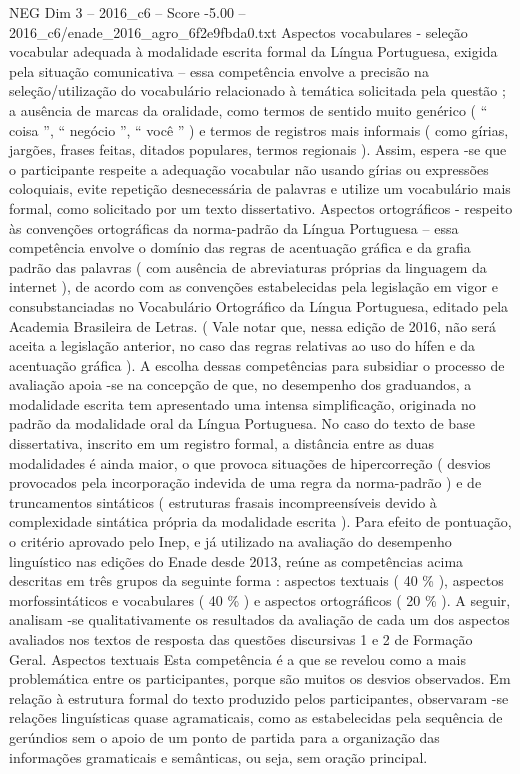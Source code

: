 \begin{textsample}{NEG Dim 3 – 2016\_c6 – Score -5.00 – 2016\_c6/enade\_2016\_agro\_6f2e9fbda0.txt}
Aspectos vocabulares - seleção vocabular adequada à modalidade escrita formal da Língua Portuguesa, exigida pela situação comunicativa – essa competência envolve a precisão na seleção/utilização do vocabulário relacionado à temática solicitada pela questão ; a ausência de marcas da oralidade, como termos de sentido muito genérico ( “ coisa ”, “ negócio ”, “ você ” ) e termos de registros mais informais ( como gírias, jargões, frases feitas, ditados populares, termos regionais ).
Assim, espera -se que o participante respeite a adequação vocabular não usando gírias ou expressões coloquiais, evite repetição desnecessária de palavras e utilize um vocabulário mais formal, como solicitado por um texto dissertativo.
Aspectos ortográficos - respeito às convenções ortográficas da norma-padrão da Língua Portuguesa – essa competência envolve o domínio das regras de acentuação gráfica e da grafia padrão das palavras ( com ausência de abreviaturas próprias da linguagem da internet ), de acordo com as convenções estabelecidas pela legislação em vigor e consubstanciadas no Vocabulário Ortográfico da Língua Portuguesa, editado pela Academia Brasileira de Letras. ( Vale notar que, nessa edição de 2016, não será aceita a legislação anterior, no caso das regras relativas ao uso do hífen e da acentuação gráfica ).
A escolha dessas competências para subsidiar o processo de avaliação apoia -se na concepção de que, no desempenho dos graduandos, a modalidade escrita tem apresentado uma intensa simplificação, originada no padrão da modalidade oral da Língua Portuguesa.
No caso do texto de base dissertativa, inscrito em um registro formal, a distância entre as duas modalidades é ainda maior, o que provoca situações de hipercorreção ( desvios provocados pela incorporação indevida de uma regra da norma-padrão ) e de truncamentos sintáticos ( estruturas frasais incompreensíveis devido à complexidade sintática própria da modalidade escrita ).
Para efeito de pontuação, o critério aprovado pelo Inep, e já utilizado na avaliação do desempenho linguístico nas edições do Enade desde 2013, reúne as competências acima descritas em três grupos da seguinte forma : aspectos textuais ( 40 \% ), aspectos morfossintáticos e vocabulares ( 40 \% ) e aspectos ortográficos ( 20 \% ).
A seguir, analisam -se qualitativamente os resultados da avaliação de cada um dos aspectos avaliados nos textos de resposta das questões discursivas 1 e 2 de Formação Geral.
Aspectos textuais Esta competência é a que se revelou como a mais problemática entre os participantes, porque são muitos os desvios observados.
Em relação à estrutura formal do texto produzido pelos participantes, observaram -se relações linguísticas quase agramaticais, como as estabelecidas pela sequência de gerúndios sem o apoio de um ponto de partida para a organização das informações gramaticais e semânticas, ou seja, sem oração principal.

\end{textsample}
